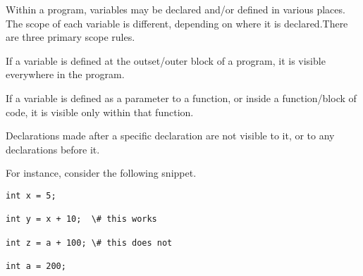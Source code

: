 

Within a program, variables may be declared and/or defined  in various places. The scope of each variable is different, depending on where it is declared.There are three primary scope rules.

If a variable is defined at the outset/outer block of a program, it is visible everywhere in the program.

If a variable is defined as a parameter to a function, or inside a function/block of code, it is visible only within that function.

Declarations made after a specific declaration are not visible to it, or to any declarations before it.

For instance, consider the following snippet.

\begin{verbatim}
int x = 5;

int y = x + 10;  \# this works

int z = a + 100; \# this does not

int a = 200; 
\end{verbatim}